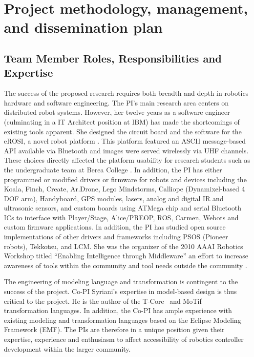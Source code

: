 
\section{Project methodology, management, and dissemination plan}
\subsection{Team Member Roles, Responsibilities and Expertise}

The success of the proposed research requires both breadth and depth in robotics hardware and software engineering.  The PI's main research area centers on distributed robot systems.  However, her twelve years as a software engineer (culminating in a IT Architect position at IBM) has made the shortcomings of existing tools apparent.  She designed the circuit board and the software for the eROSI, a novel robot platform \cite{walter2007design}.  This platform featured an ASCII message-based API available via Bluetooth and images were served wirelessly via UHF channels.  These choices directly affected the platform usability for research students such as the undergraduate team at Berea College \cite{Isaacs2006}.  In addition, the PI has either programmed or modified drivers or firmware for robots and devices including the Koala, Finch, Create, Ar.Drone, Lego Mindstorms, Calliope (Dynamixel-based 4 DOF arm), Handyboard, GPS modules, lasers, analog and digital IR and ultrasonic sensors, and custom boards using ATMega chip and serial Bluetooth ICs to interface with Player/Stage, Alice/PREOP, ROS, Carmen, Webots and custom firmware applications.  In addition, the PI has studied open source implementations of other drivers and frameworks including PSOS (Pioneer robots), Tekkotsu, and LCM.  She was the organizer of the 2010 AAAI Robotics Workshop titled ``Enabling Intelligence through Middleware'' an effort to increase awareness of tools within the community and tool needs outside the community \cite{MonicaAnderson2011}.

The engineering of modeling language and transformation is contingent to the success of the project.
Co-PI Syriani's expertise in model-based design is thus critical to the project.
He is the author of the T-Core~\cite{Syriani2010} and MoTif~\cite{Syriani2011} transformation languages.
In addition, the Co-PI has ample experience with existing modeling and transformation languages based on the Eclipse Modeling Framework (EMF).
The PIs are therefore in a unique position given their expertise, experience and enthusiasm to affect accessibility of robotics controller development within the larger community.



